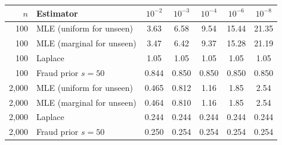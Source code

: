 \begin{tabular}{rlccccc}\toprule
$n$ & Estimator & $10^{-2}$ & $10^{-3}$ & $10^{-4}$ & $10^{-6}$ & $10^{-8}$\\\midrule
100 & MLE (uniform for unseen) & 3.63 & 6.58 & 9.54 & 15.44 & 21.35\\
100 & MLE (marginal for unseen) & 3.47 & 6.42 & 9.37 & 15.28 & 21.19\\
100 & Laplace & 1.05 & 1.05 & 1.05 & 1.05 & 1.05\\
100 & Fraud prior $s=50$ & 0.844 & 0.850 & 0.850 & 0.850 & 0.850\\
2,000 & MLE (uniform for unseen) & 0.465 & 0.812 & 1.16 & 1.85 & 2.54\\
2,000 & MLE (marginal for unseen) & 0.464 & 0.810 & 1.16 & 1.85 & 2.54\\
2,000 & Laplace & 0.244 & 0.244 & 0.244 & 0.244 & 0.244\\
2,000 & Fraud prior $s=50$ & 0.250 & 0.254 & 0.254 & 0.254 & 0.254\\
\bottomrule\end{tabular}
